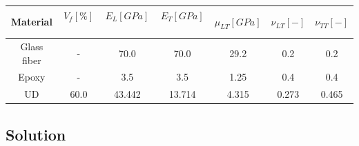 \documentclass[first,firstsupp,lastsupp,last,hyperref,table]{ETHclass}
\begin{document}
\begin{frame}
\begin{columns}
\end{columns}
\vspace{0.05cm}
\begin{table}[htbp]
\tiny
\centering
\begin{tabular}{ccccccc}
\textbf{Material} & \textbf{$V_{f}\left[\%\right]$}\  & \textbf{$E_{L}\left[GPa\right]$}\ & \textbf{$E_{T}\left[GPa\right]$}\  & \textbf{$\mu_{LT}\left[GPa\right]$} &\textbf{$\nu_{LT}\left[-\right]$} &\textbf{$\nu_{TT}\left[-\right]$} \\
\midrule
Glass fiber &-   & 70.0 & 70.0  & 29.2 & 0.2  & 0.2\\
Epoxy    &-& 3.5 & 3.5   & 1.25 &  0.4& 0.4\\
UD&60.0&43.442&13.714& 4.315& 0.273&0.465\\
\end{tabular}
\end{table}
\end{frame}

\subsection{Solution}
\end{document}
